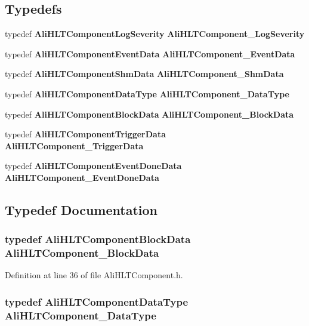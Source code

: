 \subsection*{Typedefs}
\begin{CompactItemize}
\item 
typedef {\bf Ali\-HLTComponent\-Log\-Severity} {\bf Ali\-HLTComponent\_\-Log\-Severity}
\item 
typedef {\bf Ali\-HLTComponent\-Event\-Data} {\bf Ali\-HLTComponent\_\-Event\-Data}
\item 
typedef {\bf Ali\-HLTComponent\-Shm\-Data} {\bf Ali\-HLTComponent\_\-Shm\-Data}
\item 
typedef {\bf Ali\-HLTComponent\-Data\-Type} {\bf Ali\-HLTComponent\_\-Data\-Type}
\item 
typedef {\bf Ali\-HLTComponent\-Block\-Data} {\bf Ali\-HLTComponent\_\-Block\-Data}
\item 
typedef {\bf Ali\-HLTComponent\-Trigger\-Data} {\bf Ali\-HLTComponent\_\-Trigger\-Data}
\item 
typedef {\bf Ali\-HLTComponent\-Event\-Done\-Data} {\bf Ali\-HLTComponent\_\-Event\-Done\-Data}
\end{CompactItemize}


\subsection{Typedef Documentation}
\subsubsection{\setlength{\rightskip}{0pt plus 5cm}typedef {\bf Ali\-HLTComponent\-Block\-Data} {\bf Ali\-HLTComponent\_\-Block\-Data}}\label{AliHLTComponent_8h_a4}




Definition at line 36 of file Ali\-HLTComponent.h.
\subsubsection{\setlength{\rightskip}{0pt plus 5cm}typedef {\bf Ali\-HLTComponent\-Data\-Type} {\bf Ali\-HLTComponent\_\-Data\-Type}}\label{AliHLTComponent_8h_a3}




